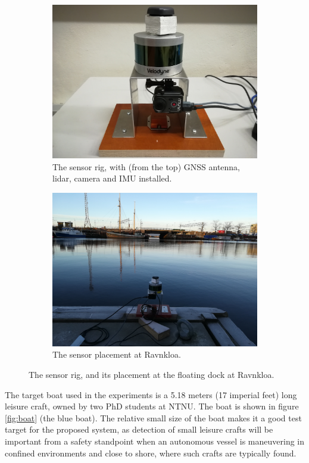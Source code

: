 \begin{figure}[!htb]
	\centering
	\begin{subfigure}[t]{.5\textwidth}
		\centering
		\includegraphics[width=.8\linewidth]{fig/sensor_rig.jpg}
		\caption{The sensor rig, with (from the top) GNSS antenna, lidar, camera and IMU installed.}
		\label{fig:sub_sensorrig}
	\end{subfigure}%
	\begin{subfigure}[t]{.5\textwidth}
		\centering
		\includegraphics[width=.8\linewidth]{fig/sensors_ravnkloa.jpg}
		\caption{The sensor placement at Ravnkloa.}
		\label{fig:sub_sensor_ravnkloa}
	\end{subfigure}
	\caption{The sensor rig, and its placement at the floating dock at Ravnkloa.}
	\label{fig:sensors_ravnkloa}
\end{figure}
The target boat used in the experiments is a 5.18 meters (17 imperial feet) long  leisure craft, owned by two PhD students at NTNU.
The boat is shown in figure \ref{fig:boat} (the blue boat). The relative small size of the boat makes it a good test target for the proposed system, as detection of small leisure crafts will be important from a safety standpoint when an autonomous vessel is maneuvering in confined environments and close to shore, where such crafts are typically found.
